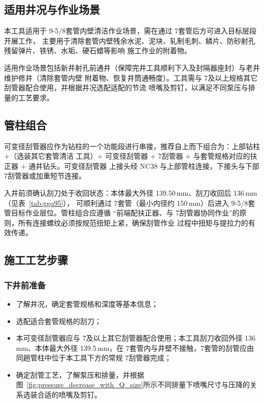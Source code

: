 \subsection{适用井况与作业场景}

本工具适用于 9-5/8\inch 套管内壁清洁作业场景，需在通过 7\inch 套管后方可进入目标层段开展工作，
主要用于清除套管内壁残余水泥、泥块、轧制毛刺、鳞片、防砂射孔残留弹片、铁锈、水垢、硬石蜡等影响
施工作业的附着物。

适用作业场景包括新井射孔前通井（保障完井工具顺利下入及封隔器座封）与老井维护修井（清除套管内壁
附着物、恢复井筒通畅度）。工具需与 7\inch 及以上规格其它刮管器配合使用，并根据井况选配适配的节流
喷嘴及剪钉，以满足不同泵压与排量的工艺要求。

\subsection{管柱组合}

可变径刮管器应作为钻柱的一个功能段进行串接，推荐自上而下组合为：上部钻柱 $+$（选装其它套管清洁
工具）$+$ 可变径刮管器 $+$ 7\inch 刮管器 $+$ 与套管规格对应的扶正器 $+$ 通井钻头。可变径刮管器
上接头经 NC38 与上部管柱连接，下接头与下部 7\inch 刮管器或加重短节连接。

入井前须确认刮刀处于收回状态：本体最大外径 139.50\,mm、刮刀收回后 136\,mm（见表~\ref{tab:ggq95}），
可顺利通过 7\inch 套管（最小内径约 150\,mm）后进入 9-5/8\inch 套管目标作业层位。管柱组合应遵循
“前端配扶正器、与 7\inch 刮管器协同作业”的原则，所有连接螺纹必须按规范扭矩上紧，确保刮管作业
过程中扭矩与提拉力的有效传递。

\subsection{施工工艺步骤}

\subsubsection{下井前准备}
\begin{itemize}
	\item 了解井况，确定套管规格和深度等基本信息；
	\item 选配适合套管规格的刮刀；
	\item 本可变径刮管器应与 7\inch 及以上其它刮管器配合使用；本工具刮刀收回外径 136\,mm、本体最大外径 139.5\,mm，在 7\inch 套管内与井壁不接触，7\inch 套管的刮管应由同趟管柱中位于本工具下方的常规 7\inch 刮管器完成；
	\item 确定刮管工艺，了解泵压和排量，并根据图~\ref{fig:pressure_decrease_with_Q_size}所示不同排量下喷嘴尺寸与压降的关系选装合适的喷嘴及剪钉。
\end{itemize}

